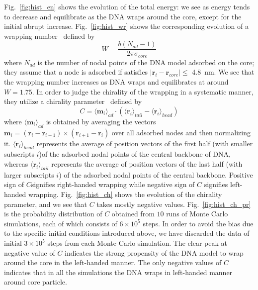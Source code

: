 \documentclass[a4paper,10pt]{article}
\begin{document}
Fig.~\ref{fig:hist_en} shows the evolution of the total energy: we see as energy tends to decrease and equilibrate as the DNA wraps around the core, except for the initial abrupt increase.
Fig.~\ref{fig:hist_wr} shows the corresponding evolution of a wrapping number~\cite{very_old} defined by
\begin{equation}\label{eq:wrap_num}
W=\dfrac{b\left(N_{ad}-1\right)}{2\pi\sigma_{core}}
\end{equation}
where $N_{ad}$ is the number of nodal points of the DNA model adsorbed on the core; they assume that a node is adsorbed if satisfies $\left|\textbf{r}_i-\textbf{r}_{core}\right|\leq$ \SI{4.8}{\nm}.
We see that the wrapping number increases as DNA wraps and equilibrates at around $W=1.75$.
In order to judge the chirality of the wrapping in a systematic manner, they utilize a chirality parameter~\cite{very_old} defined by
\begin{equation}\label{eq:chirality}
C=\langle\textbf{m}_{i}\rangle_{ad}\cdot\left(\langle\textbf{r}_{i}\rangle_{tail}-\langle\textbf{r}_{i}\rangle_{head}\right)
\end{equation}
where $\langle\textbf{m}_{i}\rangle_{ad}$ is obtained by averaging the vectors $\textbf{m}_i=\left(\textbf{r}_{i}-\textbf{r}_{i-1}\right)\times\left(\textbf{r}_{i+1}-\textbf{r}_{i}\right)$ over all adsorbed nodes and then normalizing it.
$\langle\textbf{r}_{i}\rangle_{head}$ represents the average of position vectors of the first half (with smaller subscripts $i$)of the adsorbed nodal points of the central backbone of DNA, whereas $\langle\textbf{r}_{i}\rangle_{tail}$ represents the average of position vectors of the last half (with larger subscripts $i$) of the adsorbed nodal points of the central backbone.
Positive sign of $C$signifies right-handed wrapping while negative sign of $C$ signifies left-handed wrapping.
Fig.~\ref{fig:hist_ch} shows the evolution of the chirality parameter, and we see that $C$ takes mostly negative values.
Fig.~\ref{fig:hist_ch_pr} is the probability distribution of $C$ obtained from $10$ runs of Monte Carlo simulations, each of which consists of $6\times 10^5$ steps.
In order to avoid the bias due to the specific initial conditions introduced above, we have discarded the data of initial $3\times10^5$ steps from each Monte Carlo simulation.
The clear peak at negative value of $C$ indicates the strong propensity of the DNA model to wrap around the core in the left-handed manner.
The only negative values of $C$ indicates that in all the simulations the DNA wraps in left-handed manner around core particle.
\end{document}
